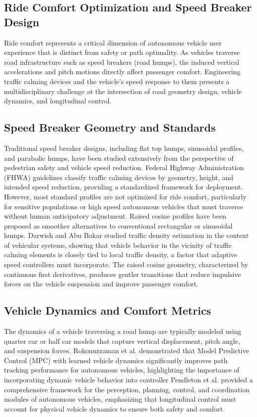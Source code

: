\documentclass[a4paper,12pt,one side]{report}
\theoremstyle{definition}
\begin{document}
\begin{itemize}
\section{Ride Comfort Optimization and Speed Breaker Design}
Ride comfort represents a critical dimension of autonomous vehicle user experience that is distinct from safety or path optimality. As vehicles traverse road infrastructure such as speed breakers (road humps), the induced vertical accelerations and pitch motions directly affect passenger comfort. Engineering traffic calming devices and the vehicle's speed response to them presents a multidisciplinary challenge at the intersection of road geometry design, vehicle dynamics, and longitudinal control.
\subsection{Speed Breaker Geometry and Standards}
Traditional speed breaker designs, including flat top humps, sinusoidal profiles, and parabolic humps, have been studied extensively from the perspective of pedestrian safety and vehicle speed reduction. Federal Highway Administration (FHWA) \cite{ewing1999traffic} guidelines classify traffic calming devices by geometry, height, and intended speed reduction, providing a standardized framework for deployment. However, most standard profiles are not optimized for ride comfort, particularly for sensitive populations or high speed autonomous vehicles that must traverse without human anticipatory adjustment.
Raised cosine profiles have been proposed as smoother alternatives to conventional rectangular or sinusoidal humps. Darwish and Abu Bakar \cite{darwish2015traffic} studied traffic density estimation in the context of vehicular systems, showing that vehicle behavior in the vicinity of traffic calming elements is closely tied to local traffic density, a factor that adaptive speed controllers must incorporate. The raised cosine geometry, characterized by continuous first derivatives, produces gentler transitions that reduce impulsive forces on the vehicle suspension and improve passenger comfort.
\subsection{Vehicle Dynamics and Comfort Metrics}
The dynamics of a vehicle traversing a road hump are typically modeled using quarter car or half car models that capture vertical displacement, pitch angle, and suspension forces. Rokonuzzaman et al. \cite{rokonuzzaman2021model} demonstrated that Model Predictive Control (MPC) with learned vehicle dynamics significantly improves path tracking performance for autonomous vehicles, highlighting the importance of incorporating dynamic vehicle behavior into controller Pendleton et al. \cite{pendleton2017perception} provided a comprehensive framework for the perception, planning, control, and coordination modules of autonomous vehicles, emphasizing that longitudinal control must account for physical vehicle dynamics to ensure both safety and comfort.

\end{itemize}
\end{document}
